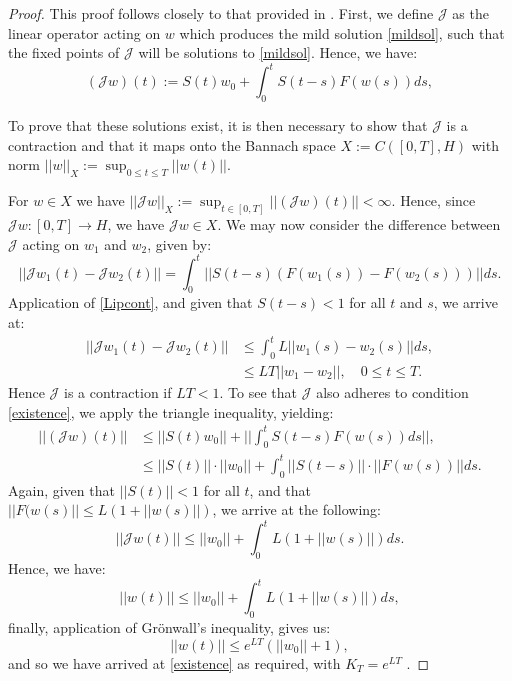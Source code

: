 \documentclass[12pt]{article}
\begin{document}
\begin{proof}
This proof follows closely to that provided in \cite{Lord}. First, we define $\mathcal{J}$ as the linear operator acting on $w$ which produces the mild solution \eqref{mildsol}, such that the fixed points of $\mathcal{J}$ will be solutions to \eqref{mildsol}. Hence, we have:
$$(\mathcal{J}w)(t):= S(t)w_0 + \int_0^tS(t-s)F(w(s))ds,$$

To prove that these solutions exist, it is then necessary to show that $\mathcal{J}$ is a contraction and that it maps onto the Bannach space $X:= C([0,T],H)$ with norm $||w||_X:=\sup_{0\leq t\leq T}||w(t)||$. 

For $w\in X$ we have $||\mathcal{J}w||_X := \sup_{t\in[0,T]}||(\mathcal{J}w)(t)|| < \infty$. Hence, since $\mathcal{J}w:[0,T]\to H$, we have $\mathcal{J}w \in X$. We may now consider the difference between $\mathcal{J}$ acting on $w_1$ and $w_2$, given by:
$$ ||\mathcal{J}w_1(t) - \mathcal{J}w_2(t)|| = \int_0^t||S(t-s)(F(w_1(s))-F(w_2(s)))||ds.$$
Application of \eqref{Lipcont}, and given that $S(t-s) < 1$ for all $t$ and $s$, we arrive at:
\begin{align*}
 ||\mathcal{J}w_1(t) - \mathcal{J}w_2(t)|| &\leq \int_0^tL||w_1(s)-w_2(s)||ds,\\
 &\leq LT||w_1 - w_2||, \quad 0\leq t\leq T.
\end{align*}
Hence $\mathcal{J}$ is a contraction if $LT<1$. To see that $\mathcal{J}$ also adheres to condition \eqref{existence}, we apply the triangle inequality, yielding:
\begin{align*}
||(\mathcal{J}w)(t)||&\leq ||S(t)w_0|| + ||\int_0^tS(t-s)F(w(s))ds||,\\
&\leq ||S(t)||\cdot ||w_0|| + \int_0^t ||S(t-s)||\cdot||F(w(s))||ds.
\end{align*}
 Again, given that $||S(t)||<1$ for all $t$, and that $||F(w(s)|| \leq L(1+||w(s)||)$, we arrive at the following:
\begin{equation*}
||\mathcal{J}w(t)||\leq||w_0|| + \int_0^t L(1 + ||w(s)||)ds.
\end{equation*}
Hence, we have:
$$||w(t)|| \leq ||w_0|| + \int_0^tL(1+||w(s)||)ds,$$
finally, application of Gr\"{o}nwall's inequality, gives us:
$$||w(t)|| \leq e^{LT}(||w_0|| + 1),$$
and so we have arrived at \eqref{existence} as required, with $K_T = e^{LT}$ \cite{Lord}. 
\end{proof}
\end{document}
